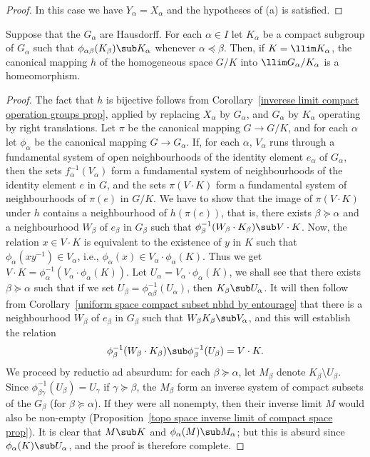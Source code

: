 \begin{proof}
In this case we have $Y_\alpha=X_\alpha$ and the hypotheses of (a) is satisfied.
\end{proof}
\begin{corollary}
Suppose that the $G_\alpha$ are Hausdorff. For each $\alpha\in I$ let $K_\alpha$ be a compact subgroup of $G_\alpha$ such that $\phi_{\alpha\beta}(K_\beta)\sub K_\alpha$ whenever $\alpha\preceq\beta$. Then, if $K=\llim K_\alpha$, the canonical mapping $h$ of the homogeneous space $G/K$ into $\llim G_\alpha/K_\alpha$ is a homeomorphism.
\end{corollary}
\begin{proof}
The fact that $h$ is bijective follows from Corollary~\ref{inverese limit compact operation groups prop}, applied by replacing $X_\alpha$ by $G_\alpha$, and $G_\alpha$ by $K_\alpha$ operating by right translations. Let $\pi$ be the canonical mapping $G\to G/K$, and for each $\alpha$ let $\phi_\alpha$ be the canonical mapping $G\to G_\alpha$. If, for each $\alpha$, $V_\alpha$ runs through a fundamental system of open neighbourhoods of the identity element $e_\alpha$ of $G_\alpha$, then the sets $f_\alpha^{-1}(V_\alpha)$ form a fundamental system of neighbourhoods of the identity element $e$ in $G$, and the sets $\pi(V\cdot K)$ form a fundamental system of neighbourhoods of $\pi(e)$ in $G/K$. We have to show that the image of $\pi(V\cdot K)$ under $h$ contains a neighbourhood of $h(\pi(e))$, that is, there exists $\beta\succeq\alpha$ and a neighbourhood $W_\beta$ of $e_\beta$ in $G_\beta$ such that $\phi_\beta^{-1}(W_\beta\cdot K_\beta)\sub V\cdot K$. Now, the relation $x\in V\cdot K$ is equivalent to the existence of $y$ in $K$ such that $\phi_\alpha(xy^{-1})\in V_\alpha$, i.e., $\phi_\alpha(x)\in V_\alpha\cdot\phi_\alpha(K)$. Thus we get $V\cdot K=\phi_\alpha^{-1}(V_\alpha\cdot \phi_\alpha(K))$. Let $U_\alpha=V_\alpha\cdot\phi_\alpha(K)$, we shall see that there exists $\beta\succeq\alpha$ such that if we set $U_\beta=\phi_{\alpha\beta}^{-1}(U_\alpha)$, then $K_\beta\sub U_\alpha$. It will then follow from Corollary~\ref{uniform space compact subset nbhd by entourage} that there is a neighbourhood $W_\beta$ of $e_\beta$ in $G_\beta$ such that $W_\beta K_\beta\sub V_\alpha$, and this will establish the relation
\[\phi_\beta^{-1}(W_\beta\cdot K_\beta)\sub\phi_\beta^{-1}(U_\beta)=V\cdot K.\]
We proceed by reductio ad absurdum: for each $\beta\succeq\alpha$, let $M_\beta$ denote $K_\beta\setminus U_\beta$. Since $\phi^{-1}_{\beta\gamma}(U_\beta)=U_\gamma$ if $\gamma\succeq\beta$, the $M_\beta$ form an inverse system of compact subsets of the $G_\beta$ (for $\beta\succeq\alpha$). If they were all nonempty, then their inverse limit $M$ would also be non-empty (Proposition~\ref{topo space inverse limit of compact space prop}). It is clear that $M\sub K$ and $\phi_\alpha(M)\sub M_\alpha$; but this is absurd since $\phi_\alpha(K)\sub U_\alpha$, and the proof is therefore complete.
\end{proof}
